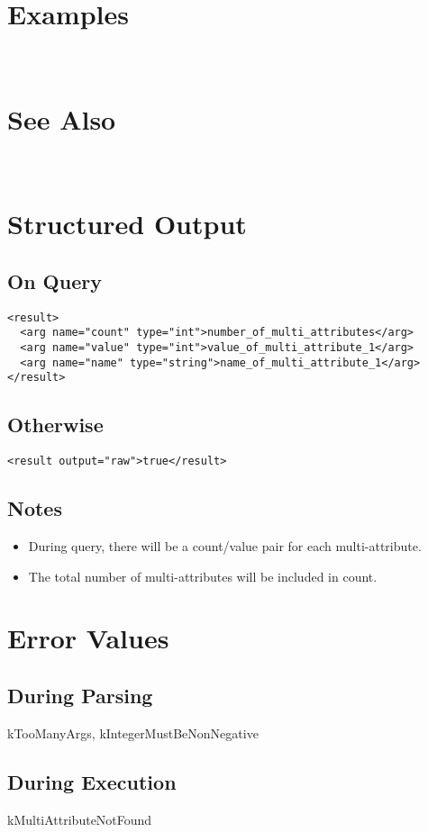 \documentclass[10pt]{article}
\begin{document}
 \\ 

\section*{ Examples }


 \\ 

\section*{ See Also }


 \\ 

\section*{ Structured Output }
\subsection*{ On Query }
\begin{verbatim}
<result>
  <arg name="count" type="int">number_of_multi_attributes</arg>
  <arg name="value" type="int">value_of_multi_attribute_1</arg>
  <arg name="name" type="string">name_of_multi_attribute_1</arg>
</result>

\end{verbatim}
\subsection*{ Otherwise }
\begin{verbatim}
<result output="raw">true</result>

\end{verbatim}
\subsection*{ Notes }
\begin{itemize}
\item  During query, there will be a count/value pair for each multi-attribute. 
\item  The total number of multi-attributes will be included in count. 

\end{itemize}
\section*{ Error Values }
\subsection*{ During Parsing }


 kTooManyArgs, kIntegerMustBeNonNegative
\subsection*{ During Execution }


 kMultiAttributeNotFound
\end{document}
